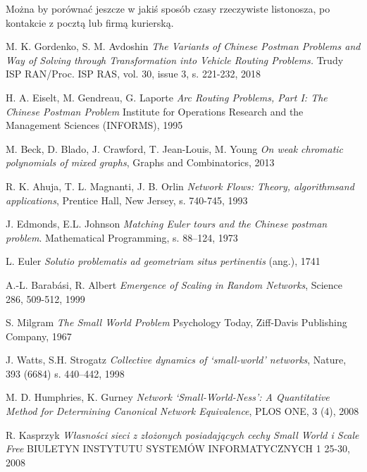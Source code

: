 \documentclass[a4paper, 12pt, twoside, openright]{article}
\begin{document}
Można by porównać jeszcze w jakiś sposób czasy rzeczywiste listonosza, po kontakcie z pocztą lub firmą kurierską.




\newpage

\begin{thebibliography}{99}
	
		M. K. Gordenko, S. M. Avdoshin \textit{The Variants of Chinese Postman Problems and Way of Solving through Transformation into Vehicle Routing Problems.} Trudy ISP RAN/Proc. ISP RAS, vol. 30, issue 3, s. 221-232, 2018
	
		H. A. Eiselt, M. Gendreau, G. Laporte \textit{Arc Routing Problems, Part I: The Chinese Postman Problem}  Institute for Operations Research and the Management Sciences (INFORMS), 1995
	
		M. Beck, D. Blado, J. Crawford, T. Jean-Louis, M. Young \textit{On weak chromatic polynomials of mixed graphs}, Graphs and Combinatorics, 2013

		R. K. Ahuja, T. L. Magnanti, J. B. Orlin \textit{Network  Flows:  Theory,  algorithmsand applications}, Prentice Hall, New Jersey, s. 740-745, 1993
	
		J. Edmonds, E.L. Johnson \textit{Matching Euler tours and the Chinese postman problem}. Mathematical Programming, s. 88–124, 1973
	
		L. Euler \textit{Solutio problematis ad geometriam situs pertinentis} (ang.), 1741
	
	
	A.-L. Barabási, R. Albert \textit{Emergence of Scaling in Random Networks}, Science 286, 509-512, 1999


	S. Milgram \textit{The Small World Problem} Psychology Today, Ziff-Davis Publishing Company, 1967
	
	J. Watts, S.H. Strogatz \textit{Collective dynamics of ‘small-world’ networks}, Nature, 393 (6684) s. 440–442, 1998	
	
	
	M. D. Humphries, K. Gurney \textit{Network ‘Small-World-Ness’: A Quantitative Method for Determining Canonical Network Equivalence}, PLOS ONE, 3 (4), 2008	
	
	R. Kasprzyk \textit{Własności sieci z złożonych posiadających cechy
	Small World i Scale Free} BIULETYN INSTYTUTU SYSTEMÓW INFORMATYCZNYCH 1 25-30, 2008	


\end{thebibliography}
\end{document}
